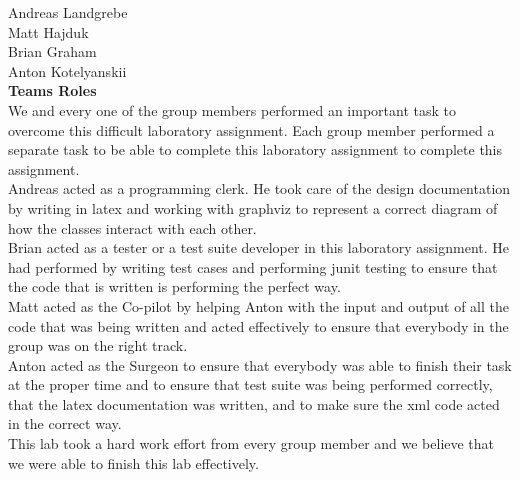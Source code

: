 \documentclass{article}
\begin{document}
Andreas Landgrebe
\\
Matt Hajduk
\\
Brian Graham
\\
Anton Kotelyanskii
\\
{\bf Teams Roles}
\\
We and every one of the group members performed an important task to overcome this difficult laboratory assignment. Each group member performed a separate task to be able to complete this laboratory assignment to complete this assignment.  
\\
Andreas acted as a programming clerk. He took care of the design documentation by writing in  latex and working with graphviz to represent a correct diagram of how the classes interact with each other.
\\
Brian acted as a tester or a test suite developer in this laboratory assignment. He had performed by writing test cases and performing junit testing to ensure that the code that is written is performing the perfect way.
\\
Matt acted as the Co-pilot by helping Anton with the input and output of all the code that was being written and acted effectively to ensure that everybody in the group was on the right track.
\\
Anton acted as the Surgeon to ensure that everybody was able to finish their task at the proper time and to ensure that test suite was being performed correctly, that the latex documentation was written, and to make sure the xml code acted in the correct way.
\\
This lab took a hard work effort from every group member and we believe that we were able to finish this lab effectively. 
\end{document}
